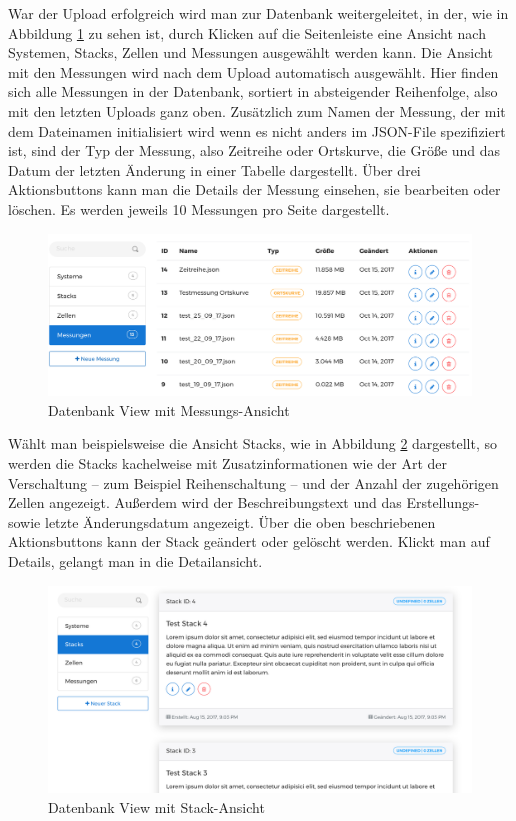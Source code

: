 War der Upload erfolgreich wird man zur Datenbank weitergeleitet, in der, wie in Abbildung \ref{fig:messungen} zu sehen ist, durch Klicken auf die Seitenleiste eine Ansicht nach Systemen, Stacks, Zellen und Messungen ausgewählt werden kann. Die Ansicht mit den Messungen wird nach dem Upload automatisch ausgewählt. Hier finden sich alle Messungen in der Datenbank, sortiert in absteigender Reihenfolge, also mit den letzten Uploads ganz oben. Zusätzlich zum Namen der Messung, der mit dem Dateinamen initialisiert wird wenn es nicht anders im JSON-File spezifiziert ist, sind der Typ der Messung, also Zeitreihe oder Ortskurve, die Größe und das Datum der letzten Änderung in einer Tabelle dargestellt. Über drei Aktionsbuttons kann man die Details der Messung einsehen, sie bearbeiten oder löschen. Es werden jeweils 10 Messungen pro Seite dargestellt.

\begin{figure}
\centering
\includegraphics[width=\textwidth]{Figures/messungen}
\caption{Datenbank View mit Messungs-Ansicht}
\label{fig:messungen}
\end{figure}

Wählt man beispielsweise die Ansicht Stacks, wie in Abbildung \ref{fig:stacks} dargestellt, so werden die Stacks kachelweise mit Zusatzinformationen wie der Art der Verschaltung -- zum Beispiel Reihenschaltung -- und der Anzahl der zugehörigen Zellen angezeigt. Außerdem wird der Beschreibungstext und das Erstellungs- sowie letzte Änderungsdatum angezeigt. Über die oben beschriebenen Aktionsbuttons kann der Stack geändert oder gelöscht werden. Klickt man auf Details, gelangt man in die Detailansicht.

\begin{figure}
\centering
\includegraphics[width=\textwidth]{Figures/stacks}
\caption{Datenbank View mit Stack-Ansicht}
\label{fig:stacks}
\end{figure}

